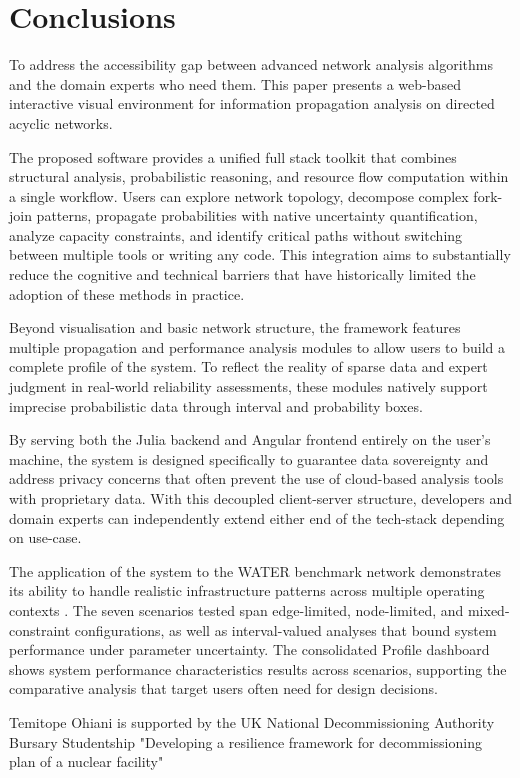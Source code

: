 \documentclass[twocolumn]{rps-esrel2026}
\begin{document}
\clearpage  
\section{Conclusions}\label{sec:conclusions}

To address the accessibility gap between advanced network analysis algorithms and the domain experts who need them. This paper presents a web-based interactive visual environment for information propagation analysis on directed acyclic networks. 

The proposed software provides a unified full stack toolkit that combines structural analysis, probabilistic reasoning, and resource flow computation within a single workflow. Users can explore network topology, decompose complex fork-join patterns, propagate probabilities with native uncertainty quantification, analyze capacity constraints, and identify critical paths without switching between multiple tools or writing any code. This integration aims to  substantially reduce the cognitive and technical barriers that have historically limited the adoption of these methods in practice.

Beyond visualisation and basic network structure, the framework features multiple propagation and performance analysis modules to allow users to build a complete profile of the system. To reflect the reality of sparse data and expert judgment in real-world reliability assessments, these modules natively support  imprecise probabilistic data through interval and probability boxes. 

By serving both the Julia backend and Angular frontend entirely on the user's machine, the system is designed specifically to guarantee data sovereignty and address privacy concerns that often prevent the use of cloud-based analysis tools with proprietary data. With this decoupled client-server structure, developers and domain experts can independently extend either end of the tech-stack depending on use-case. 

The application of the system to the WATER benchmark network demonstrates its ability to handle realistic infrastructure patterns across multiple operating contexts . The seven scenarios tested span edge-limited, node-limited, and mixed-constraint configurations, as well as interval-valued analyses that bound system performance under parameter uncertainty. The consolidated Profile dashboard shows system performance characteristics results across scenarios, supporting the comparative analysis that target users often need for design decisions.



\begin{acknowledgement}
Temitope Ohiani is supported by the UK National Decommissioning Authority Bursary Studentship "Developing a resilience framework for decommissioning plan of a nuclear facility"


\end{acknowledgement}


\end{document}
